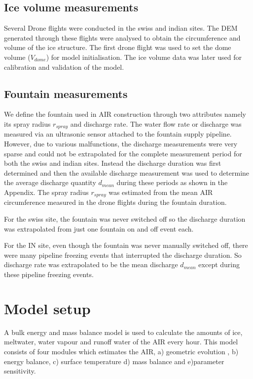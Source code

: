 \documentclass[utf8]{frontiersSCNS} %
\begin{document}
\subsection{Ice volume measurements}
Several Drone flights were conducted in the swiss and indian sites. The DEM generated through these flights were
analysed to obtain the circumference and volume of the ice structure. The first drone flight was used to set the dome volume
($V_{dome}$) for model initialisation. The ice volume data was later used for calibration and validation of the model. 

\subsection{Fountain measurements} 
We define the fountain used in AIR construction through two attributes namely its spray radius $r_{spray}$ and discharge
rate. The water flow rate or discharge was measured via an ultrasonic sensor attached to the fountain supply pipeline.
However, due to various malfunctions, the discharge measurements were very sparse and could not be extrapolated for the
complete measurement period for both the swiss and indian sites. Instead the discharge duration was first determined and
then the available discharge measurement was used to determine the average discharge quantity $d_{mean}$ during these
periods as shown in the Appendix. The spray radius $r_{spray}$ was estimated from the mean AIR circumference measured in
the drone flights during the fountain duration.  

For the swiss site, the fountain was never switched off so the discharge duration was extrapolated from just one fountain
on and off event each.  

For the IN site, even though the fountain was never manually switched off, there were many pipeline freezing events that
interrupted the discharge duration. So discharge rate was extrapolated to be the mean discharge $d_{mean}$ except during
these pipeline freezing events.

\section{Model setup}

A bulk energy and mass balance model is used to calculate the amounts of ice, meltwater, water vapour and runoff water
of the AIR every hour. This model consists of four modules which estimates the AIR, a) geometric evolution , b) energy
balance, c) surface temperature d) mass balance and e)parameter sensitivity. 
\end{document}
